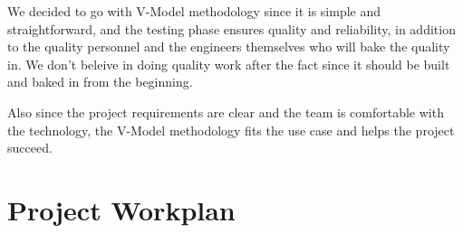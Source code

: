 \documentclass[a4paper]{report}
\begin{document}
We decided to go with V-Model methodology since it is simple and straightforward, and the testing phase ensures quality and reliability, in addition to the quality personnel and the engineers themselves who will bake the quality in. We don't beleive in doing quality work after the fact since it should be built and baked in from the beginning.

Also since the project requirements are clear and the team is comfortable with the technology, the V-Model methodology fits the use case and helps the project succeed.

\chapter{Project Workplan}
\end{document}
